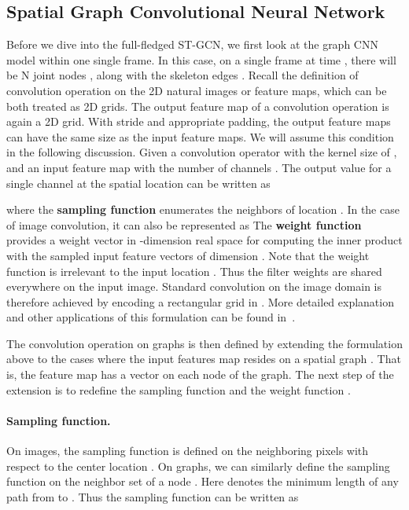 \documentclass[letterpaper]{article} \usepackage{aaai18}  \usepackage{times}  \usepackage{helvet}  \usepackage{courier}  \usepackage{url}  \usepackage{graphicx}
\begin{document}
\subsection{Spatial Graph Convolutional Neural Network}
Before we dive into the full-fledged ST-GCN, we first look at the graph CNN model within one single frame.
In this case, on a single frame at time , there will be N joint nodes , along with the skeleton edges .
Recall the definition of convolution operation on the 2D natural images or feature maps, which can be both treated as 2D grids.
The output feature map of a convolution operation is again a 2D grid.
With stride  and appropriate padding, the output feature maps can have the same size as the input feature maps. 
We will assume this condition in the following discussion.
Given a convolution operator with the kernel size of , and an input feature map  with the number of channels .
The output value for a single channel at the spatial location  can be written as 



where the \textbf{sampling function}  enumerates the neighbors of location .
In the case of image convolution, it can also be represented as  
The \textbf{weight function}  provides a weight vector in -dimension real space for computing the inner product with the sampled input feature vectors of dimension .
Note that the weight function is irrelevant to the input location .
Thus the filter weights are shared everywhere on the input image.
Standard convolution on the image domain is therefore achieved by encoding a rectangular grid in .
More detailed explanation and other applications of this formulation can be found in~\cite{Dai2017Arxiv}.

The convolution operation on graphs is then defined by extending the formulation above to the cases where the input features map resides on a spatial graph .
That is, the feature map  has a vector on each node of the graph.
The next step of the extension is to redefine the sampling function  and the weight function .

\paragraph{Sampling function.} 
On images, the sampling function  is defined on the neighboring pixels with respect to the center location . 
On graphs, we can similarly define the sampling function on the neighbor set  of a node .
Here  denotes the minimum length of any path from  to . 
Thus the sampling function  can be written as
\end{document}
